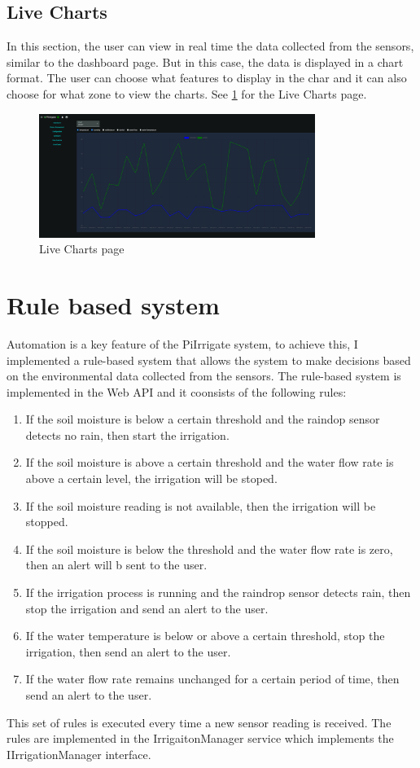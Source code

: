 \subsection{Live Charts}
In this section, the user can view in real time the data collected from the sensors, similar to the dashboard page. But in this case, the data is 
displayed in a chart format. The user can choose what features to display in the char and it can also choose for what zone to view the charts.
See \ref{fig:live-charts-page} for the Live Charts page.
\begin{figure}[H]
    \centering
    \includegraphics[width=0.8\textwidth]{images/live-charts.png}
    \caption{Live Charts page}
    \label{fig:live-charts-page}
\end{figure}


\section{Rule based system}
Automation is a key feature of the PiIrrigate system,
to achieve this, I implemented a rule-based system that allows the system
to make decisions based on the environmental data collected from the sensors.
The rule-based system is implemented in the Web API and it coonsists
of the following rules:
\begin{enumerate}
    \item If the soil moisture is below a certain threshold and the raindop sensor detects no rain, then start the irrigation.
    \item If the soil moisture is above a certain threshold and the water flow rate is above a certain level, the irrigation will be stoped.
    \item If the soil moisture reading is not available, then the irrigation will be stopped.
    \item If the soil moisture is below the threshold and the water flow rate is zero, then an alert will b sent to the user.
    \item If the irrigation process is running and the raindrop sensor detects rain, then stop the irrigation and send an alert to the user.
    \item If the water temperature is below or above a certain threshold, stop the irrigation, then send an alert to the user.
    \item If the water flow rate remains unchanged for a certain period of time, then send an alert to the user.
\end{enumerate}
This set of rules is executed every time a new sensor reading is received.
The rules are implemented in the IrrigaitonManager service which implements the IIrrigationManager interface.                                                   

